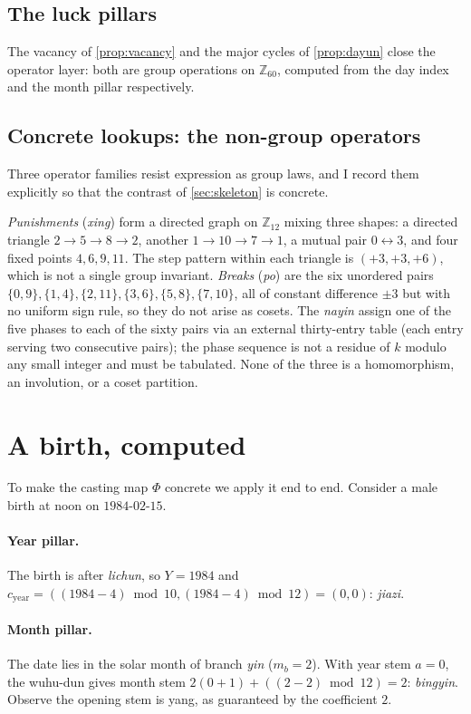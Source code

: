 \documentclass[11pt,a4paper]{article}
\theoremstyle{definition}
\theoremstyle{remark}
\newcommand{\Z}{\mathbb{Z}}
\begin{document}
\subsection{The luck pillars}
The vacancy of \cref{prop:vacancy} and the major cycles of \cref{prop:dayun} close the operator layer: both are group operations on $\Z_{60}$, computed from the day index and the month pillar respectively.

\subsection{Concrete lookups: the non-group operators}\label{sec:nonfit}
Three operator families resist expression as group laws, and I record them explicitly so that the contrast of \cref{sec:skeleton} is concrete.

\emph{Punishments} (\emph{xing}) form a directed graph on $\Z_{12}$ mixing three shapes: a directed triangle $2\to5\to8\to2$, another $1\to10\to7\to1$, a mutual pair $0\leftrightarrow3$, and four fixed points $4,6,9,11$. The step pattern within each triangle is $(+3,+3,+6)$, which is not a single group invariant. \emph{Breaks} (\emph{po}) are the six unordered pairs $\{0,9\},\{1,4\},\{2,11\},\{3,6\},\{5,8\},\{7,10\}$, all of constant difference $\pm3$ but with no uniform sign rule, so they do not arise as cosets. The \emph{nayin} assign one of the five phases to each of the sixty pairs via an external thirty-entry table (each entry serving two consecutive pairs); the phase sequence is not a residue of $k$ modulo any small integer and must be tabulated. None of the three is a homomorphism, an involution, or a coset partition.

\section{A birth, computed}\label{sec:example}
To make the casting map $\Phi$ concrete we apply it end to end. Consider a male birth at noon on $1984$-$02$-$15$.

\paragraph{Year pillar.} The birth is after \emph{lichun}, so $Y=1984$ and $c_{\text{year}}=((1984-4)\bmod10,(1984-4)\bmod12)=(0,0)$: \emph{jiazi}.

\paragraph{Month pillar.} The date lies in the solar month of branch \emph{yin} ($m_b=2$). With year stem $a=0$, the wuhu-dun gives month stem $2(0+1)+((2-2)\bmod12)=2$: \emph{bingyin}. Observe the opening stem is yang, as guaranteed by the coefficient $2$.
\end{document}
